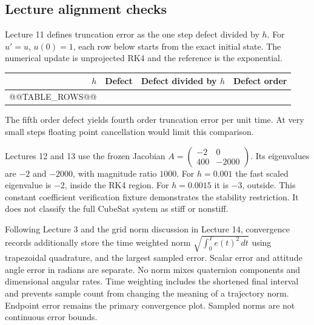 \subsection{Lecture alignment checks}
Lecture 11 defines truncation error as the one step defect divided by $h$.
For $u'=u$, $u(0)=1$, each row below starts from the exact initial state.
The numerical update is unprojected RK4 and the reference is the exponential.
\begin{center}
\begin{tabular}{rrrr}
$h$ & Defect & Defect divided by $h$ & Defect order \\
\hline
@@TABLE_ROWS@@
\end{tabular}
\end{center}
The fifth order defect yields fourth order truncation error per unit time.
At very small steps floating point cancellation would limit this comparison.

Lectures 12 and 13 use the frozen Jacobian
$A=\left(\begin{smallmatrix}-2&0\\400&-2000\end{smallmatrix}\right)$.
Its eigenvalues are $-2$ and $-2000$, with magnitude ratio $1000$.
For $h=0.001$ the fast scaled eigenvalue is $-2$, inside the RK4 region.
For $h=0.0015$ it is $-3$, outside. This constant coefficient verification
fixture demonstrates the stability restriction. It does not classify the
full CubeSat system as stiff or nonstiff.

Following Lecture 3 \cite{goza3} and the grid norm discussion in Lecture 14, convergence
records additionally store the time weighted norm
$\sqrt{\int_0^T e(t)^2\,dt}$ using trapezoidal quadrature, and the largest
sampled error. Scalar error and attitude angle error in radians are separate.
No norm mixes quaternion components and dimensional angular rates.
Time weighting includes the shortened final interval and prevents sample
count from changing the meaning of a trajectory norm. Endpoint error remains
the primary convergence plot. Sampled norms are not continuous error bounds.

